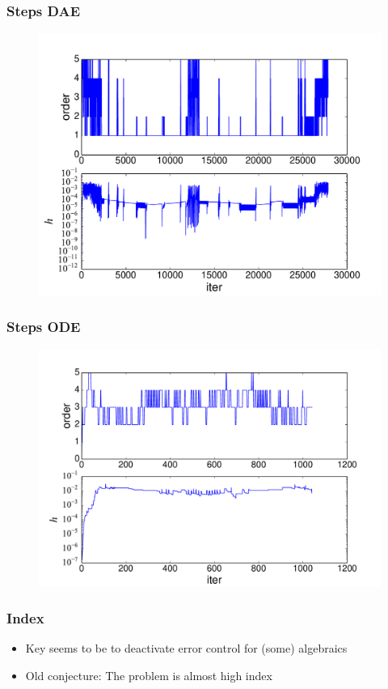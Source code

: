 \documentclass[]{beamer}
\begin{document}
\begin{frame}
\frametitle{Steps DAE}
\begin{figure}[ht]
\centering
\includegraphics[width=\linewidth]{steps_dae.pdf}
\end{figure}
\end{frame}

\begin{frame}
\frametitle{Steps ODE}
\begin{figure}[ht]
\centering
\includegraphics[width=\linewidth]{steps_ode.pdf}
\end{figure}
\end{frame}

\begin{frame}
\frametitle{Index}
\begin{itemize}
\item
Key seems to be to deactivate error control for (some) algebraics
\item
Old conjecture: The problem is almost high index
\end{itemize}
\end{frame}
\end{document}
